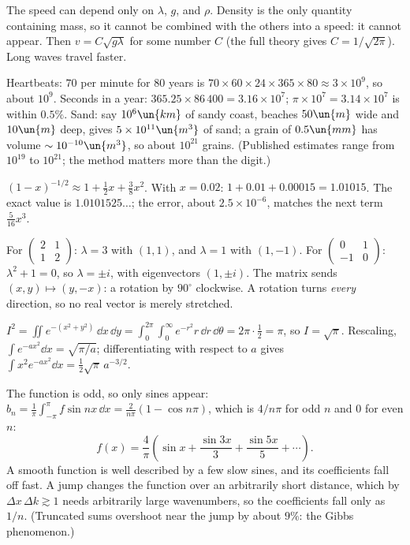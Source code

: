 
 The speed can depend only on $\lambda$, $g$, and $\rho$. Density is the only quantity containing mass, so it cannot be combined with the others into a speed: it cannot appear. Then $v = C\sqrt{g\lambda}$ for some number $C$ (the full theory gives $C = 1/\sqrt{2\pi}$). Long waves travel faster.

 Heartbeats: $70$ per minute for $80$ years is $70\times60\times24\times365\times80\approx3\times10^9$, so about $10^9$. Seconds in a year: $365.25\times86\,400 = 3.16\times10^7$; $\pi\times10^7 = 3.14\times10^7$ is within $0.5\%$. Sand: say $10^6\un{km}$ of sandy coast, beaches $50\un{m}$ wide and $10\un{m}$ deep, gives $5\times10^{11}\un{m^3}$ of sand; a grain of $0.5\un{mm}$ has volume $\sim10^{-10}\un{m^3}$, so about $10^{21}$ grains. (Published estimates range from $10^{19}$ to $10^{21}$; the method matters more than the digit.)

 $(1-x)^{-1/2}\approx1 + \tfrac12x + \tfrac38x^2$. With $x = 0.02$: $1 + 0.01 + 0.00015 = 1.01015$. The exact value is $1.0101525\ldots$; the error, about $2.5\times10^{-6}$, matches the next term $\tfrac{5}{16}x^3$.

 For $\begin{pmatrix}2&1\\1&2\end{pmatrix}$: $\lambda = 3$ with $(1,1)$, and $\lambda = 1$ with $(1,-1)$. For $\begin{pmatrix}0&1\\-1&0\end{pmatrix}$: $\lambda^2 + 1 = 0$, so $\lambda = \pm i$, with eigenvectors $(1,\pm i)$. The matrix sends $(x,y)\mapsto(y,-x)$: a rotation by $90^\circ$ clockwise. A rotation turns \emph{every} direction, so no real vector is merely stretched.

 $I^2 = \iint e^{-(x^2+y^2)}\,\dd x\,\dd y = \int_0^{2\pi}\!\!\int_0^\infty e^{-r^2}r\,\dd r\,\dd\theta = 2\pi\cdot\tfrac12 = \pi$, so $I = \sqrt\pi$. Rescaling, $\int e^{-ax^2}\dd x = \sqrt{\pi/a}$; differentiating with respect to $a$ gives $\int x^2e^{-ax^2}\dd x = \tfrac12\sqrt\pi\,a^{-3/2}$.

 The function is odd, so only sines appear: $b_n = \tfrac1\pi\int_{-\pi}^{\pi}f\sin nx\,\dd x = \tfrac{2}{n\pi}(1-\cos n\pi)$, which is $4/n\pi$ for odd $n$ and $0$ for even $n$:
\[
  f(x) = \frac4\pi\left(\sin x + \frac{\sin3x}{3} + \frac{\sin5x}{5} + \cdots\right).
\]
A smooth function is well described by a few slow sines, and its coefficients fall off fast. A jump changes the function over an arbitrarily short distance, which by $\Delta x\,\Delta k\gtrsim1$ needs arbitrarily large wavenumbers, so the coefficients fall only as $1/n$. (Truncated sums overshoot near the jump by about $9\%$: the Gibbs phenomenon.)

